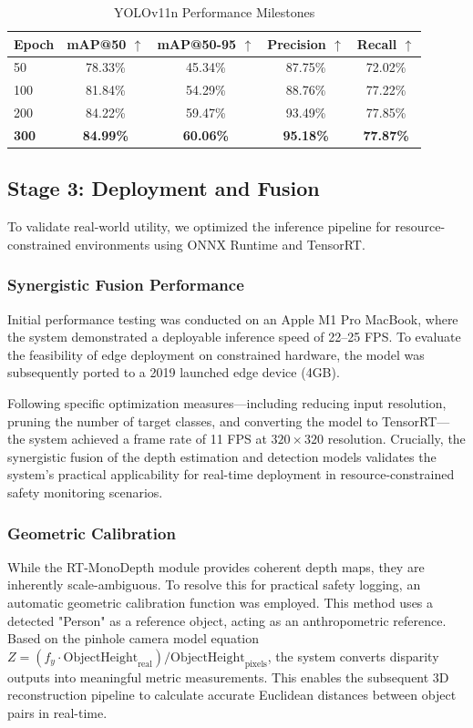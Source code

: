 \documentclass{article}
\begin{document}
\begin{table}[H]
    \centering
    \caption{YOLOv11n Performance Milestones}
    \label{tab:yolo_milestones}
    \begin{tabular}{lcccc}
    \toprule
    \textbf{Epoch} & \textbf{mAP@50} $\uparrow$ & \textbf{mAP@50-95} $\uparrow$ & \textbf{Precision} $\uparrow$ & \textbf{Recall} $\uparrow$ \\
    \midrule
    50 & 78.33\% & 45.34\% & 87.75\% & 72.02\% \\
    100 & 81.84\% & 54.29\% & 88.76\% & 77.22\% \\
    200 & 84.22\% & 59.47\% & 93.49\% & 77.85\% \\
    \textbf{300} & \textbf{84.99\%} & \textbf{60.06\%} & \textbf{95.18\%} & \textbf{77.87\%} \\
    \bottomrule
    \end{tabular}
\end{table}

\subsection{Stage 3: Deployment and Fusion}
To validate real-world utility, we optimized the inference pipeline for resource-constrained environments using ONNX Runtime and TensorRT.

\subsubsection{Synergistic Fusion Performance}
Initial performance testing was conducted on an Apple M1 Pro MacBook, where the system demonstrated a deployable inference speed of 22–25 FPS. To evaluate the feasibility of edge deployment on constrained hardware, the model was subsequently ported to a 2019 launched edge device (4GB).

Following specific optimization measures—including reducing input resolution, pruning the number of target classes, and converting the model to TensorRT—the system achieved a frame rate of 11 FPS at $320 \times 320$ resolution. Crucially, the synergistic fusion of the depth estimation and detection models validates the system's practical applicability for real-time deployment in resource-constrained safety monitoring scenarios.

\subsubsection{Geometric Calibration}
While the RT-MonoDepth module provides coherent depth maps, they are inherently scale-ambiguous. To resolve this for practical safety logging, an automatic geometric calibration function was employed. This method uses a detected "Person" as a reference object, acting as an anthropometric reference. Based on the pinhole camera model equation $Z=(f_y \cdot \text{ObjectHeight}_{\text{real}}) / \text{ObjectHeight}_{\text{pixels}}$, the system converts disparity outputs into meaningful metric measurements. This enables the subsequent 3D reconstruction pipeline to calculate accurate Euclidean distances between object pairs in real-time.
\end{document}
